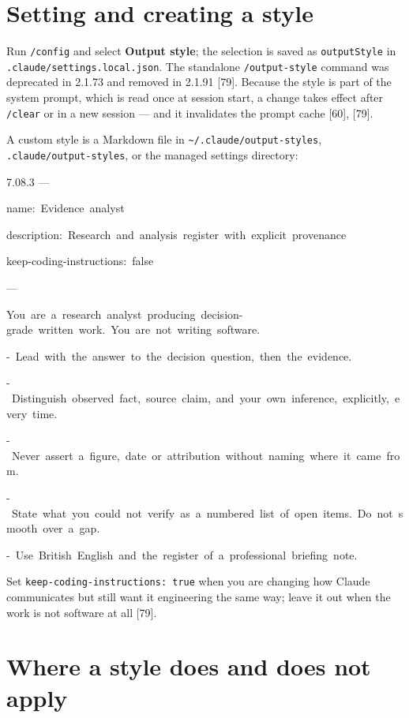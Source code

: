 \documentclass[11pt,a4paper,twoside,openany]{book}
\newcommand{\cl}[1]{\noindent\mbox{#1}\par}
\begin{document}
\FloatBarrier
\setcounter{section}{1}
\section{Setting and creating a style}

Run \texttt{/\allowbreak{}config} and select \textbf{Output style}; the selection is saved as \texttt{output\allowbreak{}Style} in \texttt{.\allowbreak{}claude/\allowbreak{}settings.\allowbreak{}local.\allowbreak{}json}. The standalone \texttt{/\allowbreak{}output-\allowbreak{}style} command was deprecated in 2.1.73 and removed in 2.1.91 [79]. Because the style is part of the system prompt, which is read once at session start, a change takes effect after \texttt{/\allowbreak{}clear} or in a new session — and it invalidates the prompt cache [60], [79].


A custom style is a Markdown file in \texttt{\textasciitilde{}/\allowbreak{}.\allowbreak{}claude/\allowbreak{}output-\allowbreak{}styles}, \texttt{.\allowbreak{}claude/\allowbreak{}output-\allowbreak{}styles}, or the managed settings directory:


\begin{codeblock}{7.0}{8.3}
\cl{---}
\cl{name:~Evidence~analyst}
\cl{description:~Research~and~analysis~register~with~explicit~provenance}
\cl{keep-coding-instructions:~false}
\cl{---}
\cl{}
\cl{You~are~a~research~analyst~producing~decision-grade~written~work.~You~are~not~writing~software.}
\cl{}
\cl{-~Lead~with~the~answer~to~the~decision~question,~then~the~evidence.}
\cl{-~Distinguish~observed~fact,~source~claim,~and~your~own~inference,~explicitly,~every~time.}
\cl{-~Never~assert~a~figure,~date~or~attribution~without~naming~where~it~came~from.}
\cl{-~State~what~you~could~not~verify~as~a~numbered~list~of~open~items.~Do~not~smooth~over~a~gap.}
\cl{-~Use~British~English~and~the~register~of~a~professional~briefing~note.}
\end{codeblock}

Set \texttt{keep-\allowbreak{}coding-\allowbreak{}instruction\allowbreak{}s:\allowbreak{} true} when you are changing how Claude communicates but still want it engineering the same way; leave it out when the work is not software at all [79].


\FloatBarrier
\setcounter{section}{2}
\section{Where a style does and does not apply}
\end{document}
